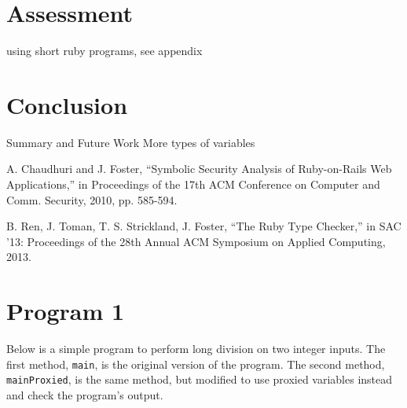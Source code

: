 \documentclass[10pt]{article}
\begin{document}
\section{Assessment}
using short ruby programs, see appendix

\section{Conclusion}
Summary and Future Work
More types of variables

\begin{thebibliography}{99}
A. Chaudhuri and J. Foster, ``Symbolic Security Analysis of Ruby-on-Rails Web Applications,'' in Proceedings of the 17th ACM Conference on Computer and Comm. Security, 2010, pp. 585-594.

B. Ren, J. Toman, T. S. Strickland, J. Foster, ``The Ruby Type Checker,'' in SAC '13: Proceedings of the 28th Annual ACM Symposium on Applied Computing, 2013.

\end{thebibliography}

\appendix

\section{Program 1}
Below is a simple program to perform long division on two integer inputs.  The first method, \texttt{main}, is the original version of the program.  The second method, \texttt{mainProxied}, is the same method, but modified to use proxied variables instead and check the program's output.\\
\end{document}
